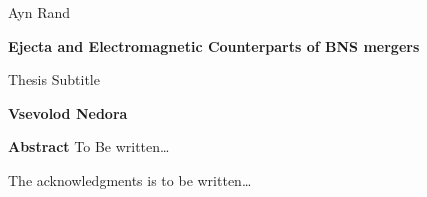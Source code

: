 \documentclass[
openright,
12pt, %
english,%
onehalfspacing, %
nolistspacing, %
nohyperref, %
headsepline, %
]{MastersDoctoralThesis} %
\begin{document}
\hfill Ayn Rand
\cleardoublepage

\begin{center}
    \Large
    \textbf{Ejecta and Electromagnetic Counterparts of BNS mergers}
    
    \vspace{0.4cm}
    \large
    Thesis Subtitle
    
    \vspace{0.4cm}
    \textbf{Vsevolod Nedora}
    
    \vspace{0.9cm}
    \textbf{Abstract}
    To Be written\ldots
\end{center}



\makeatletter
\renewcommand\@biblabel[1]{}
\makeatother

\begingroup
\def\refname{Published content and contributions}
\def\bibname{Published content and contributions}

\endgroup




\begin{acknowledgements}
    \addchaptertocentry{\acknowledgementname} %
    The acknowledgments is to be written\ldots
\end{acknowledgements}

\end{document}
